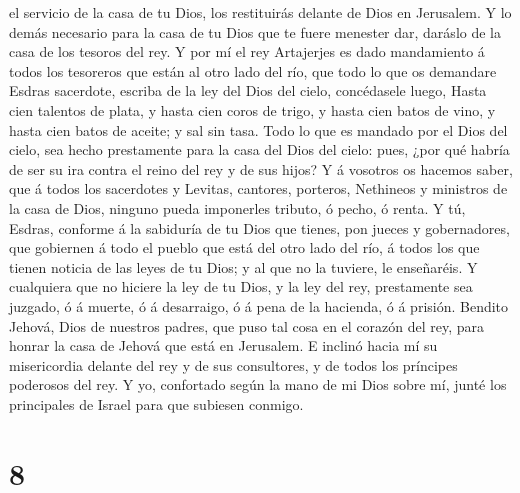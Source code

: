 el servicio de la casa de tu Dios, los restituirás delante de Dios en
Jerusalem.  Y lo demás necesario para la casa de tu Dios
que te fuere menester dar, daráslo de la casa de los tesoros del rey.
 Y por mí el rey Artajerjes es dado mandamiento á todos
los tesoreros que están al otro lado del río, que todo lo que os
demandare Esdras sacerdote, escriba de la ley del Dios del cielo,
concédasele luego,  Hasta cien talentos de plata, y hasta
cien coros de trigo, y hasta cien batos de vino, y hasta cien batos de
aceite; y sal sin tasa.  Todo lo que es mandado por el
Dios del cielo, sea hecho prestamente para la casa del Dios del cielo:
pues, ¿por qué habría de ser su ira contra el reino del rey y de sus
hijos?  Y á vosotros os hacemos saber, que á todos los
sacerdotes y Levitas, cantores, porteros, Nethineos y ministros de la
casa de Dios, ninguno pueda imponerles tributo, ó pecho, ó renta.
 Y tú, Esdras, conforme á la sabiduría de tu Dios que
tienes, pon jueces y gobernadores, que gobiernen á todo el pueblo que
está del otro lado del río, á todos los que tienen noticia de las leyes
de tu Dios; y al que no la tuviere, le enseñaréis.  Y
cualquiera que no hiciere la ley de tu Dios, y la ley del rey,
prestamente sea juzgado, ó á muerte, ó á desarraigo, ó á pena de la
hacienda, ó á prisión.  Bendito Jehová, Dios de nuestros
padres, que puso tal cosa en el corazón del rey, para honrar la casa de
Jehová que está en Jerusalem.  E inclinó hacia mí su
misericordia delante del rey y de sus consultores, y de todos los
príncipes poderosos del rey. Y yo, confortado según la mano de mi Dios
sobre mí, junté los principales de Israel para que subiesen conmigo.

\hypertarget{section-7}{%
\section{8}\label{section-7}}

